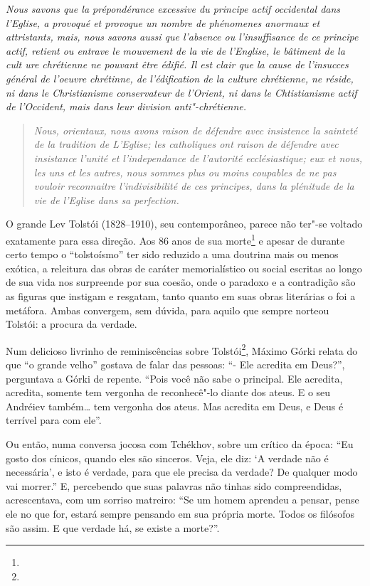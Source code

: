 \emph{Nous savons que la prépondérance excessive du principe actif
occidental dans l'Eglise, a provoqué et provoque un nombre de phénomenes
anormaux et attristants, mais, nous savons aussi que l'absence ou
l'insuffisance de ce principe actif, retient ou entrave le mouvement de
la vie de l'Englise, le bâtiment de la cult ure chrétienne ne pouvant
être édifié. Il est clair que la cause de l'insucces général de l'oeuvre
chrétinne, de l'édification de la culture chrétienne, ne réside, ni dans
le Christianisme conservateur de l'Orient, ni dans le Chtistianisme
actif de l'Occident, mais dans leur division anti"-chrétienne.}

\begin{quote}
\emph{Nous, orientaux, nous avons raison de défendre avec insistence la
sainteté de la tradition de L'Eglise; les catholiques ont raison de
défendre avec insistance l'unité et l'independance de l'autorité
ecclésiastique; eux et nous, les uns et les autres, nous sommes plus ou
moins coupables de ne pas vouloir reconnaitre l'indivisibilité de ces
principes, dans la plénitude de la vie de l'Eglise dans sa perfection.}
\end{quote}

O grande Lev Tolstói (1828--1910), seu contemporâneo, parece não
ter"-se voltado exatamente para essa direção. Aos 86 anos de sua
morte\footnote{} e apesar de durante certo tempo o ``tolstoísmo'' ter
sido reduzido a uma doutrina mais ou menos exótica, a releitura das
obras de caráter memorialístico ou social escritas ao longo de sua vida
nos surpreende por sua coesão, onde o paradoxo e a contradição são as
figuras que instigam e resgatam, tanto quanto em suas obras literárias o
foi a metáfora. Ambas convergem, sem dúvida, para aquilo que sempre
norteou Tolstói: a procura da verdade.

Num delicioso livrinho de reminiscências sobre Tolstói\footnote{},
Máximo Górki relata do que ``o grande velho'' gostava de falar das
pessoas: ``- Ele acredita em Deus?'', perguntava a Górki de repente.
``Pois você não sabe o principal. Ele acredita, acredita, somente tem
vergonha de reconhecê"-lo diante dos ateus. E o seu Andréiev também\ldots{} tem vergonha dos ateus. Mas acredita em Deus, e Deus é terrível para com
ele''.

Ou então, numa conversa jocosa com Tchékhov, sobre um crítico da época:
``Eu gosto dos cínicos, quando eles são sinceros. Veja, ele diz: `A
verdade não é necessária', e isto é verdade, para que ele precisa da
verdade? De qualquer modo vai morrer.'' E, percebendo que suas palavras
não tinhas sido compreendidas, acrescentava, com um sorriso matreiro:
``Se um homem aprendeu a pensar, pense ele no que for, estará sempre
pensando em sua própria morte. Todos os filósofos são assim. E que
verdade há, se existe a morte?''.

